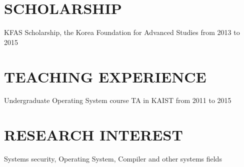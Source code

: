 \section{SCHOLARSHIP}
   KFAS Scholarship, the Korea Foundation for Advanced Studies from 2013 to 2015

\section{TEACHING EXPERIENCE}
    Undergraduate Operating System course TA in KAIST from 2011 to 2015

\section{RESEARCH INTEREST}
    Systems security, Operating System, Compiler and other systems fields
